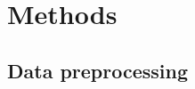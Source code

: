 \documentclass[
10pt, %
a4paper, %
oneside, %
headinclude,footinclude, %
BCOR5mm, %
]{scrartcl}
\begin{document}

\section{Methods}

%
%
%





\subsection{Data preprocessing}
\end{document}
